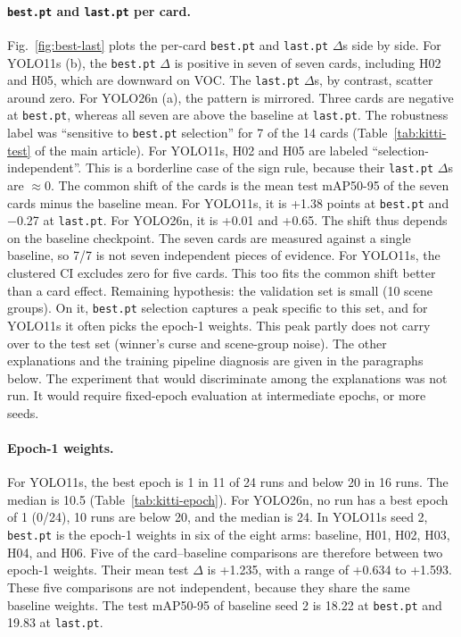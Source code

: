 \paragraph{\texttt{best.pt} and \texttt{last.pt} per card.}
Fig.~\ref{fig:best-last} plots the per-card \texttt{best.pt} and \texttt{last.pt} $\Delta$s side by side. For YOLO11s (b), the \texttt{best.pt} $\Delta$ is positive in seven of seven cards, including H02 and H05, which are downward on VOC. The \texttt{last.pt} $\Delta$s, by contrast, scatter around zero. For YOLO26n (a), the pattern is mirrored. Three cards are negative at \texttt{best.pt}, whereas all seven are above the baseline at \texttt{last.pt}. The robustness label was ``sensitive to \texttt{best.pt} selection'' for 7 of the 14 cards (Table~\ref{tab:kitti-test} of the main article). For YOLO11s, H02 and H05 are labeled ``selection-independent''. This is a borderline case of the sign rule, because their \texttt{last.pt} $\Delta$s are $\approx$0. The common shift of the cards is the mean test mAP50-95 of the seven cards minus the baseline mean. For YOLO11s, it is +1.38 points at \texttt{best.pt} and $-$0.27 at \texttt{last.pt}. For YOLO26n, it is +0.01 and +0.65. The shift thus depends on the baseline checkpoint. The seven cards are measured against a single baseline, so 7/7 is not seven independent pieces of evidence. For YOLO11s, the clustered CI excludes zero for five cards. This too fits the common shift better than a card effect. Remaining hypothesis: the validation set is small (10 scene groups). On it, \texttt{best.pt} selection captures a peak specific to this set, and for YOLO11s it often picks the epoch-1 weights. This peak partly does not carry over to the test set (winner's curse and scene-group noise). The other explanations and the training pipeline diagnosis are given in the paragraphs below. The experiment that would discriminate among the explanations was not run. It would require fixed-epoch evaluation at intermediate epochs, or more seeds.

\paragraph{Epoch-1 weights.}
For YOLO11s, the best epoch is 1 in 11 of 24 runs and below 20 in 16 runs. The median is 10.5 (Table~\ref{tab:kitti-epoch}). For YOLO26n, no run has a best epoch of 1 (0/24), 10 runs are below 20, and the median is 24. In YOLO11s seed 2, \texttt{best.pt} is the epoch-1 weights in six of the eight arms: baseline, H01, H02, H03, H04, and H06. Five of the card--baseline comparisons are therefore between two epoch-1 weights. Their mean test $\Delta$ is +1.235, with a range of +0.634 to +1.593. These five comparisons are not independent, because they share the same baseline weights. The test mAP50-95 of baseline seed 2 is 18.22 at \texttt{best.pt} and 19.83 at \texttt{last.pt}.

